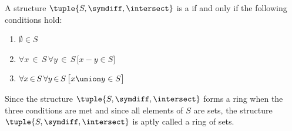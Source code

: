 \begin{dfn}
    \label{dfn:ring-rings-of-sets}
    A structure \( \tuple{S, \symdiff, \intersect} \) is a  if and only if the following conditions hold:
    \begin{enumerate}[topsep=2pt,noitemsep,label=\textup{\texttt{(\alph*)}}]
        \setlength{\itemsep}{0.1em}
        \item \( \emptyset \in S \)
        \item \( \forall x\,{\in}\,S \, \forall y\,{\in}\,S \, \big[ x - y \in S \big] \)
        \item \( \forall x\,{\in}\,S \, \forall y\,{\in}\,S \, \big[ x \union y \in S \big] \)
    \end{enumerate}
\end{dfn}

\begin{rem}
    Since the structure \( \tuple{S,\symdiff, \intersect} \) forms a ring when the three conditions are met
    and since all elements of \( S \) are sets, the structure \( \tuple{S, \symdiff, \intersect} \) is aptly called a ring of sets.
\end{rem}


